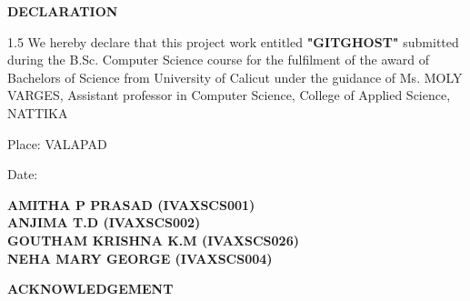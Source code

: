 \documentclass[12pt, a4paper, oneside]{report}
\begin{document}
\begin{singlespacing}
\begin{center}
    {\large \textbf{DECLARATION} \par}
\end{center}
\vspace{1cm}
\begin{spacing}{1.5}
We hereby declare that this project work entitled \textbf{"GITGHOST"} submitted during the B.Sc. Computer Science course for the fulfilment of the award of Bachelors of Science from University of Calicut under the guidance of Ms. MOLY VARGES, Assistant professor in Computer Science, College of Applied Science, NATTIKA
\end{spacing}

\vspace{1.5cm}
\noindent Place: VALAPAD \par
\vspace{0.2cm}
\noindent Date: 

\vspace{1.5cm}
\begin{flushright}
    \textbf{AMITHA P PRASAD (IVAXSCS001)} \\ \vspace{0.4cm}
    \textbf{ANJIMA T.D (IVAXSCS002)} \\ \vspace{0.4cm}
    \textbf{GOUTHAM KRISHNA K.M (IVAXSCS026)} \\ \vspace{0.4cm}
    \textbf{NEHA MARY GEORGE (IVAXSCS004)}
\end{flushright}
\end{singlespacing}
\newpage
\begin{center}
    {\Large \textbf{ACKNOWLEDGEMENT} \par}
\end{center}
\vspace{1cm}
\end{document}
